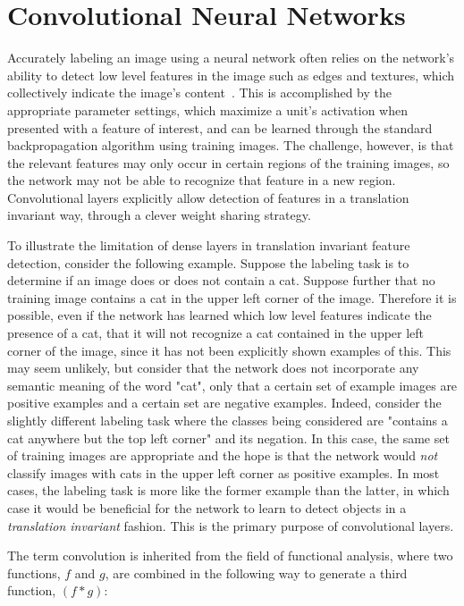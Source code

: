 \section{Convolutional Neural Networks}

Accurately labeling an image using a neural network often relies on the network's ability to detect low level features in the image such as edges and textures, which collectively indicate the image's content~\cite{ng2011}.
This is accomplished by the appropriate parameter settings, which maximize a unit's activation when presented with a feature of interest, and can be learned through the standard backpropagation algorithm using training images. 
The challenge, however, is that the relevant features may only occur in certain regions of the training images, so the network may not be able to recognize that feature in a new region.
Convolutional layers explicitly allow detection of features in a translation invariant way, through a clever weight sharing strategy.

To illustrate the limitation of dense layers in translation invariant feature detection, consider the following example.
Suppose the labeling task is to determine if an image does or does not contain a cat.
Suppose further that no training image contains a cat in the upper left corner of the image.
Therefore it is possible, even if the network has learned which low level features indicate the presence of a cat, that it will not recognize a cat contained in the upper left corner of the image, since it has not been explicitly shown examples of this.
This may seem unlikely, but consider that the network does not incorporate any semantic meaning of the word "cat", only that a certain set of example images are positive examples and a certain set are negative examples.
Indeed, consider the slightly different labeling task where the classes being considered are "contains a cat anywhere but the top left corner" and its negation.
In this case, the same set of training images are appropriate and the hope is that the network would \emph{not} classify images with cats in the upper left corner as positive examples.
In most cases, the labeling task is more like the former example than the latter, in which case it would be beneficial for the network to learn to detect objects in a \emph{translation invariant} fashion. 
This is the primary purpose of convolutional layers.

The term convolution is inherited from the field of functional analysis, where two functions, $f$ and $g$, are combined in the following way to generate a third function, $(f*g)$:

